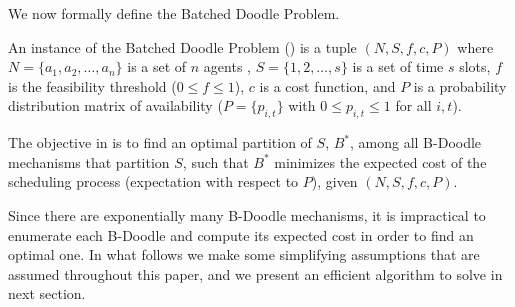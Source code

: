 We now formally define the Batched Doodle Problem.
\begin{definition} \label{bdoodle:def:bdp}
An instance of the Batched Doodle Problem (\BDP) is a tuple $(N, S, f, c, P)$ where $N = \{a_1, a_2, \dots, a_n\}$ is a set of $n$ agents , $S = \{1, 2, \dots, s\}$ is a set of time $s$ slots, $f$ is the feasibility threshold ($0 \leq f \leq 1$), $c$ is a cost function, and $P$ is a probability distribution matrix of availability ($P = \{p_{i, t}\}$ with $0 \leq p_{i,t}\leq 1$ for all $i, t$).

The objective in \BDPs is to find an optimal partition of $S$, $B^*$, among all B-Doodle mechanisms that partition $S$, such that $B^*$ minimizes the expected cost of the scheduling process (expectation with respect to $P$), given $(N, S, f, c, P)$.
\end{definition}
Since there are exponentially many B-Doodle mechanisms, it is impractical to enumerate each B-Doodle and compute its expected cost in order to find an optimal one. In what follows we make some simplifying assumptions that are assumed throughout this paper, and we present an efficient algorithm to solve \BDPs in next section. 



